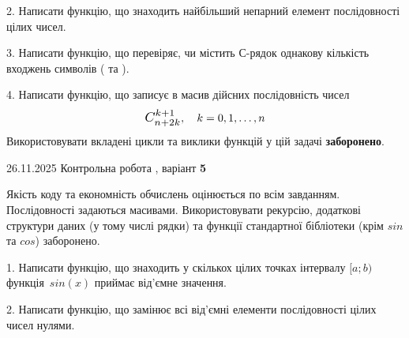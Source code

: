 \documentclass[11pt, ukrainian]{article}
\begin{document}
{{{{\begin {large}

2. Написати функцію, що знаходить найбільший непарний елемент послідовності цілих чисел.

\vspace{2mm}


3. Написати функцію, що перевіряє, чи містить С-рядок однакову кількість входжень символів ( та ).

\vspace{2mm}


4. 
Написати функцію, що записує в масив дійсних послідовність чисел
$$\scalebox{1.2}{$C_{n+2k}^{k+1}$}, \quad k=0,1,\ldots,n$$
\quad Використовувати вкладені цикли та виклики функцій у цій задачі \textbf{заборонено}.

\vspace{2mm}

\end{large}
\vspace{20mm}


{{26.11.2025 Контрольна робота , варіант  \No \textbf { 5 }\par}}


{
Якість коду та економність обчислень оцінюється по всім завданням. Послідовності задаються масивами. Використовувати рекурсію, додаткові структури даних (у тому числі рядки) та функції стандартної бібліотеки (крім $sin$ та $cos$) заборонено.

\vspace{2mm}

\begin {large}
1. Написати функцію, що знаходить у скількох цілих точках інтервалу $[a; b)$ функція~$sin(x)$ приймає від'ємне значення.

\vspace{2mm}


2. Написати функцію, що замінює всі від'ємні елементи послідовності цілих чисел нулями.

\vspace{2mm}


\end{large}}}}}}
\end{document}
